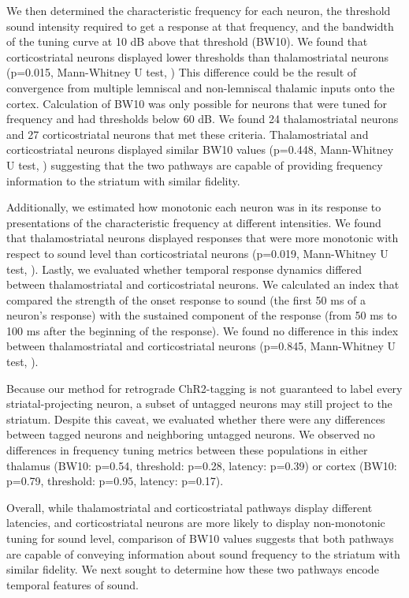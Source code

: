 We then determined the characteristic frequency for each neuron, the threshold sound intensity required to get a response at that frequency, and the bandwidth of the tuning curve at 10 dB above that threshold (BW10). 
%
We found that corticostriatal neurons displayed lower thresholds than thalamostriatal neurons (p=0.015, Mann-Whitney U test, \fig{\FrequencyThreshold})
%
This difference could be the result of convergence from multiple lemniscal and non-lemniscal thalamic inputs onto the cortex. 
%
Calculation of BW10 was only possible for neurons that were tuned for frequency and had thresholds below 60 dB. We found 24 thalamostriatal neurons and 27 corticostriatal neurons that met these criteria.
%
Thalamostriatal and corticostriatal neurons displayed similar BW10 values (p=0.448, Mann-Whitney U test, \fig{\FrequencyBW}) suggesting that the two pathways are capable of providing frequency information to the striatum with similar fidelity. 

Additionally, we estimated how monotonic each neuron was in its response to presentations of the characteristic frequency at different intensities.
%
We found that thalamostriatal neurons displayed responses that were more monotonic with respect to sound level than corticostriatal neurons (p=0.019, Mann-Whitney U test, \fig{\FrequencyMonotonicity}). 
%
Lastly, we evaluated whether temporal response dynamics differed between thalamostriatal and corticostriatal neurons. 
%
We calculated an index that compared the strength of the onset response to sound (the first 50 ms of a neuron's response) with the sustained component of the response (from 50 ms to 100 ms after the beginning of the response). 
%
We found no difference in this index between thalamostriatal and corticostriatal neurons (p=0.845, Mann-Whitney U test, \fig{\FrequencyOnsetivity}). 


Because our method for retrograde ChR2-tagging is not guaranteed to label every striatal-projecting neuron, a subset of untagged neurons may still project to the striatum. Despite this caveat, we evaluated whether there were any differences between tagged neurons and neighboring untagged neurons. We observed no differences in frequency tuning metrics between these populations in either thalamus (BW10: p=0.54, threshold: p=0.28, latency: p=0.39) or cortex (BW10: p=0.79, threshold: p=0.95, latency: p=0.17).

Overall, while thalamostriatal and corticostriatal pathways display different latencies, and corticostriatal neurons are more likely to display non-monotonic tuning for sound level, comparison of BW10 values suggests that both pathways are capable of conveying information about sound frequency to the striatum with similar fidelity. 
%
We next sought to determine how these two pathways encode temporal features of sound.

